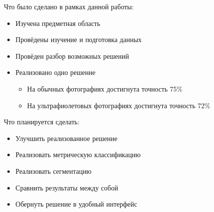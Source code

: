 \documentclass[14pt]{matmex-diploma}
\begin{document}
    Что было сделано в рамках данной работы:
    
    \begin{itemize}
        \item Изучена предметная область
        \item Провёдены изучение и подготовка данных
        \item Провёден разбор возможных решений
        \item Реализовано одно решение
            \begin{itemize}
                \item На обычных фотографиях достигнута точность 75\%
                \item На ультрафиолетовых фотографиях достигнута точность 72\%
            \end{itemize}      
    \end{itemize}      
        
    Что планируется сделать:
    
    \begin{itemize}
        \item Улучшить реализованное решение
        \item Реализовать метрическую классификацию
        \item Реализовать сегментацию
        \item Сравнить результаты между собой
        \item Обернуть решение в удобный интерфейс
    \end{itemize}      


\setmonofont[Mapping=tex-text]{CMU Typewriter Text}


\end{document}
